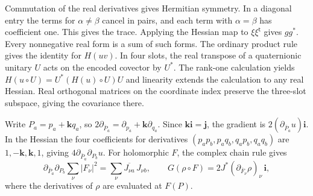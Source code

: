 Commutation of the real derivatives gives Hermitian symmetry. In a diagonal entry the terms for $\alpha\ne\beta$ cancel in pairs, and each term with $\alpha=\beta$ has coefficient one. This gives the trace. Applying the Hessian map to $\xi\xi^{\mathsf t}$ gives $gg^*$. Every nonnegative real form is a sum of such forms. The ordinary product rule gives the identity for $H(uv)$. In four slots, the real transpose of a quaternionic unitary $U$ acts on the encoded covector by $U^*$. The rank-one calculation yields $H(u\circ U)=U^*(H(u)\circ U)U$ and linearity extends the calculation to any real Hessian. Real orthogonal matrices on the coordinate index preserve the three-slot subspace, giving the covariance there.

Write $P_a=p_a+\mathbf k q_a$, so $2\partial_{\bar P_a}=\partial_{p_a}+\mathbf k\partial_{q_a}$. Since $\mathbf{ki}=\mathbf j$, the gradient is $2(\partial_{\bar P_a}u)\mathbf i$. In the Hessian the four coefficients for derivatives $(p_ap_b,p_aq_b,q_ap_b,q_aq_b)$ are $1,-\mathbf k,\mathbf k,1$, giving $4\partial_{\bar P_a}\partial_{P_b}u$. For holomorphic $F$, the complex chain rule gives
\[
\partial_{\bar P_a}\partial_{P_b}\sum_\nu|F_\nu|^2
 =\sum_\nu\overline{J_{\nu a}}\,J_{\nu b},\qquad
G(\rho\circ F)=2J^*(\partial_{\bar F_\nu}\rho)_\nu\,\mathbf i,
\]
where the derivatives of $\rho$ are evaluated at $F(P)$.
